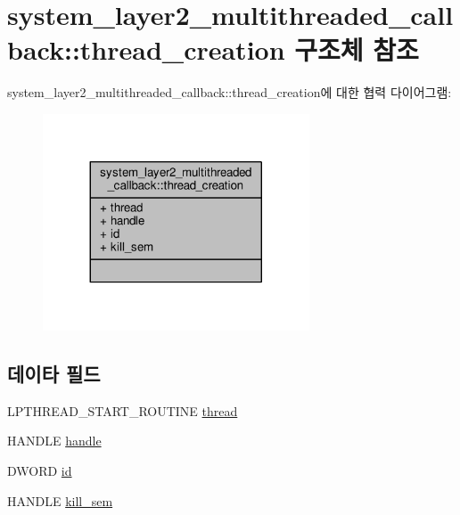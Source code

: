 \hypertarget{structavdecc__lib_1_1system__layer2__multithreaded__callback_1_1thread__creation}{}\section{system\+\_\+layer2\+\_\+multithreaded\+\_\+callback\+:\+:thread\+\_\+creation 구조체 참조}
\label{structavdecc__lib_1_1system__layer2__multithreaded__callback_1_1thread__creation}


system\+\_\+layer2\+\_\+multithreaded\+\_\+callback\+:\+:thread\+\_\+creation에 대한 협력 다이어그램\+:
\nopagebreak
\begin{figure}[H]
\begin{center}
\leavevmode
\includegraphics[width=224pt]{structavdecc__lib_1_1system__layer2__multithreaded__callback_1_1thread__creation__coll__graph}
\end{center}
\end{figure}
\subsection*{데이타 필드}
\begin{DoxyCompactItemize}
\item 
L\+P\+T\+H\+R\+E\+A\+D\+\_\+\+S\+T\+A\+R\+T\+\_\+\+R\+O\+U\+T\+I\+NE \hyperlink{structavdecc__lib_1_1system__layer2__multithreaded__callback_1_1thread__creation_aa930d342e4c53bcc9bf4da7995c81a3b}{thread}
\item 
H\+A\+N\+D\+LE \hyperlink{structavdecc__lib_1_1system__layer2__multithreaded__callback_1_1thread__creation_a07ff1fa563f3d58110ce80c3c1796f9b}{handle}
\item 
D\+W\+O\+RD \hyperlink{structavdecc__lib_1_1system__layer2__multithreaded__callback_1_1thread__creation_a7bd09c5ec3b0d91cb6e79c1261ee1e8a}{id}
\item 
H\+A\+N\+D\+LE \hyperlink{structavdecc__lib_1_1system__layer2__multithreaded__callback_1_1thread__creation_a8938321e37bc0147ed95ffd6aee8c099}{kill\+\_\+sem}
\end{DoxyCompactItemize}


